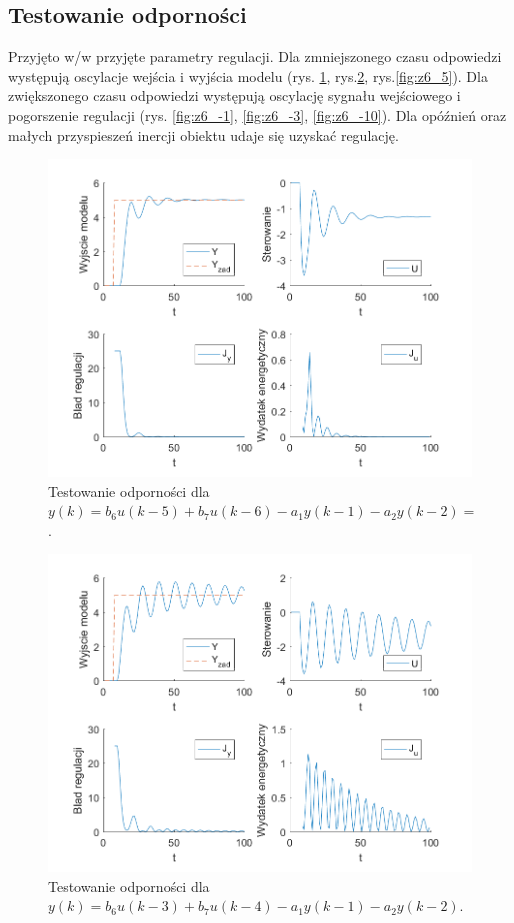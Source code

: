 \documentclass[a4paper, 10pt]{article}
\begin{document}
	\subsection{Testowanie odporności}
	Przyjęto w/w przyjęte parametry regulacji. Dla zmniejszonego czasu odpowiedzi występują oscylacje wejścia i wyjścia modelu (rys. \ref{fig:z6_1}, rys.\ref{fig:z6_3}, rys.\ref{fig:z6_5}). Dla zwiększonego czasu odpowiedzi występują oscylację sygnału wejściowego i pogorszenie regulacji (rys. \ref{fig:z6_-1}, \ref{fig:z6_-3}, \ref{fig:z6_-10}). Dla opóźnień oraz małych przyspieszeń inercji obiektu udaje się uzyskać regulację.
	\begin{figure}[H]
	\centering
	\includegraphics[width=0.9\linewidth]{z6_1}
	\caption{Testowanie odporności dla  $y(k) = b_6u(k-5)+b_7u(k-6)-a_1y(k-1)-a_2y(k-2)=$.}
	\label{fig:z6_1}
	\end{figure}
	
	\begin{figure}[H]
		\centering
		\includegraphics[width=0.9\linewidth]{z6_3}
		\caption{Testowanie odporności dla  $y(k) = b_6u(k-3)+b_7u(k-4)-a_1y(k-1)-a_2y(k-2)$.}
		\label{fig:z6_3}
		\end{figure}
		
\end{document}
